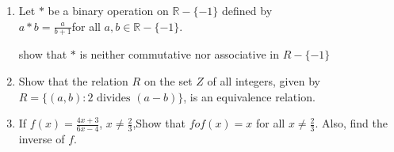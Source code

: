 \begin{enumerate}
\item Let $*$ be a binary operation on $\mathbb{R} - \{-1\}$ defined by\\    
$a * b = \frac{a}{b + 1}$for all $a, b \in \mathbb{R} - \{-1\}$.
                                                                                                
show that $*$ is neither commutative nor associative in ${R} - \{-1\}$
\item Show that the relation $R$ on the set $Z$ of all integers, given by $R = \{(a, b):2 \text{ divides } (a - b)\}$, is an equivalence relation.
\item If $f(x) = \frac{4x + 3}{6x - 4}$, $x \neq \frac{2}{3}$,Show that $fof(x) = x$ for all $x \neq \frac{2}{3}$. Also, find the inverse of $f$.
\end{enumerate}
